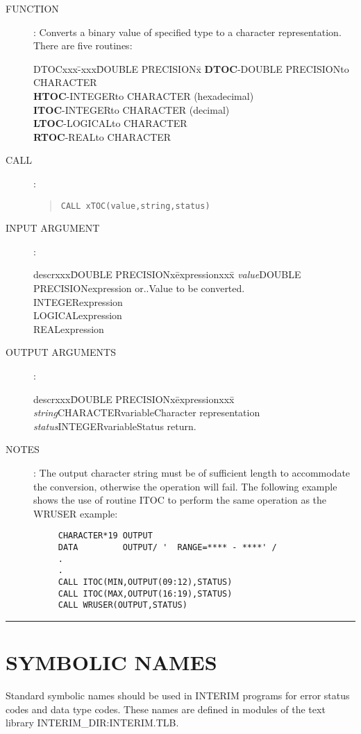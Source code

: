 \documentclass{article}
\begin{document}
\begin{description}
\item [FUNCTION]:
Converts a binary value of specified type to a character representation.
There are five routines:
\begin{center}
\begin{tabbing}
DTOCxxx\=-xxx\=DOUBLE PRECISIONx\=\kill
{\bf DTOC}\>-\>DOUBLE PRECISION\>to CHARACTER\\
{\bf HTOC}\>-\>INTEGER\>to CHARACTER (hexadecimal)\\
{\bf ITOC}\>-\>INTEGER\>to CHARACTER (decimal)\\
{\bf LTOC}\>-\>LOGICAL\>to CHARACTER\\
{\bf RTOC}\>-\>REAL\>to CHARACTER
\end{tabbing}
\end{center}
\item [CALL]:
\begin{quote}
{\tt CALL xTOC(value,string,status)}
\end{quote}
\item [INPUT ARGUMENT]:
\begin{tabbing}
descrxxx\=DOUBLE PRECISIONx\=expressionxxx\=\kill
{\em value}\>DOUBLE PRECISION\>expression or..\>Value to be converted.\\
\>INTEGER\>expression\\
\>LOGICAL\>expression\\
\>REAL\>expression
\end{tabbing}
\item [OUTPUT ARGUMENTS]:
\begin{tabbing}
descrxxx\=DOUBLE PRECISIONx\=expressionxxx\=\kill
{\em string}\>CHARACTER\>variable\>Character representation\\
{\em status}\>INTEGER\>variable\>Status return.
\end{tabbing}
\item [NOTES]:
The output character string must be of sufficient length to accommodate
the conversion, otherwise the operation will fail.
The following example shows the use of routine ITOC to perform the same
operation as the WRUSER example:
\begin{verbatim}
     CHARACTER*19 OUTPUT
     DATA         OUTPUT/ '  RANGE=**** - ****' /
     .
     .
     CALL ITOC(MIN,OUTPUT(09:12),STATUS)
     CALL ITOC(MAX,OUTPUT(16:19),STATUS)
     CALL WRUSER(OUTPUT,STATUS)
\end{verbatim}
\end{description}
\rule{\textwidth}{0.3mm}
\section {SYMBOLIC NAMES}
Standard symbolic names should be used in INTERIM programs for error status
codes and data type codes.
These names are defined in modules of the text library INTERIM\_DIR:INTERIM.TLB.
\end{document}
